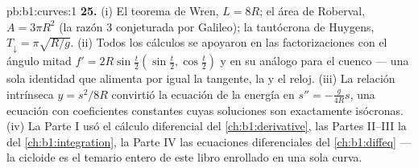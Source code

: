 \begin{solution}{pb:b1:curves:1}
\textbf{25.} (i) El teorema de Wren, $L = 8R$; el área de Roberval, $A =
3\pi R^2$ (la razón $3$ conjeturada por Galileo); la
tautócrona de Huygens, $T_\downarrow = \pi\sqrt{R/g}$. (ii) Todos los
cálculos se apoyaron en las factorizaciones con el ángulo mitad $f' =
2R\sin\frac t2(\sin\frac t2, \cos\frac t2)$ y en su análogo para el
cuenco --- una sola identidad que alimenta por igual la tangente, la  y el
reloj. (iii) La relación intrínseca $y = s^2/8R$ convirtió la
ecuación de la energía en $s'' = -\frac{g}{4R}s$, una ecuación 
con coeficientes constantes cuyas soluciones son exactamente
isócronas. (iv) La Parte I usó el cálculo diferencial del
\cref{ch:b1:derivative}, las Partes II--III la  del
\cref{ch:b1:integration}, la Parte IV las ecuaciones diferenciales del
\cref{ch:b1:diffeq} --- la cicloide es el temario entero de este libro
enrollado en una sola curva.
\end{solution}
